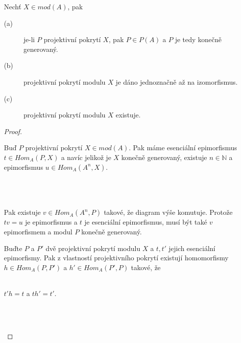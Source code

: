      \begin{lem}\label{lem-proj-pokryti}
       Nechť $X\in mod(A)$, pak
       \begin{description}
         \item[(a)] je-li $P$ projektivní pokrytí $X$, pak $P\in P(A)$ a $P$ je tedy konečně generovaný. 
         \item[(b)] projektivní pokrytí modulu $X$ je dáno jednoznačně až na izomorfismus. 
         \item[(c)] projektivní pokrytí modulu $X$ existuje.
       \end{description} 
     \end{lem}
     \begin{proof}
       \begin{description}
         \item
         \item[(a)] Buď $P$ projektivní pokrytí $X\in mod(A)$. Pak máme 
         esenciální epimorfismus $t\in Hom_A(P,X)$ a navíc jelikož je $X$ konečně generovaný,  
         existuje $n\in \mathbb{N}$ a epimorfismus $u\in Hom_A(A^n,X)$.\\\\      
           \centerline{} \\\\ 
         Pak existuje $v\in Hom_A(A^n,P)$ takové, že diagram výše komutuje. Protože $tv=u$ 
         je epimorfismus a $t$ je esenciální epimorfismus, musí být také $v$ 
         epimorfismem a modul $P$ konečně generovaný.
         \item[(b)] Buďte $P$ a $P'$ dvě projektivní pokrytí modulu $X$ a $t,t'$ 
         jejich esenciální epimorfismy. Pak z vlastností projektivního pokrytí 
         existují homomorfismy $h\in Hom_A(P,P')$ a $h'\in Hom_A(P',P)$ takové, 
         že \\\\
         \centerline{$t'h=t$ a $th'=t'$.}\\\\      
         \centerline{}
\end{description}
\end{proof}
